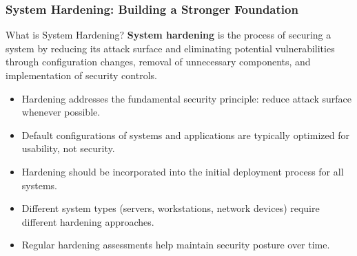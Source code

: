 \documentclass{beamer}
\begin{document}
\begin{frame}
    \frametitle{System Hardening: Building a Stronger Foundation}
    
    \begin{block}{What is System Hardening?}
    \textbf{System hardening} is the process of securing a system by reducing its attack surface and eliminating potential vulnerabilities through configuration changes, removal of unnecessary components, and implementation of security controls.
    \end{block}
    
    \begin{itemize}
    \item Hardening addresses the fundamental security principle: reduce attack surface whenever possible.
    \item Default configurations of systems and applications are typically optimized for usability, not security.
    \item Hardening should be incorporated into the initial deployment process for all systems.
    \item Different system types (servers, workstations, network devices) require different hardening approaches.
    \item Regular hardening assessments help maintain security posture over time.
    \end{itemize}
    
    \end{frame}
    
\end{document}
